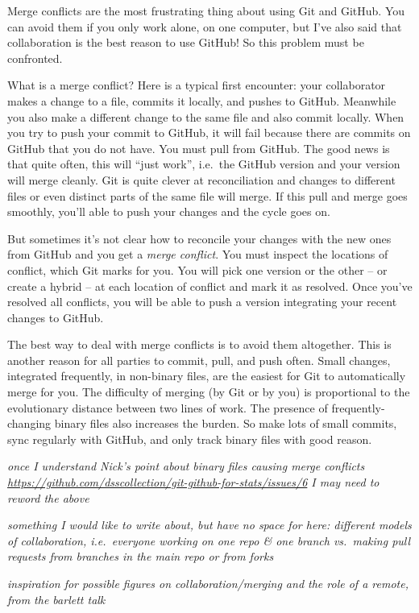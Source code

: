 \documentclass[12pt]{article}
\begin{document}
Merge conflicts are the most frustrating thing about using Git and
GitHub. You can avoid them if you only work alone, on one computer, but
I've also said that collaboration is the best reason to use GitHub! So
this problem must be confronted.

What is a merge conflict? Here is a typical first encounter: your
collaborator makes a change to a file, commits it locally, and pushes to
GitHub. Meanwhile you also make a different change to the same file and
also commit locally. When you try to push your commit to GitHub, it will
fail because there are commits on GitHub that you do not have. You must
pull from GitHub. The good news is that quite often, this will ``just
work'', i.e.~the GitHub version and your version will merge cleanly. Git
is quite clever at reconciliation and changes to different files or even
distinct parts of the same file will merge. If this pull and merge goes
smoothly, you'll able to push your changes and the cycle goes on.

But sometimes it's not clear how to reconcile your changes with the new
ones from GitHub and you get a \emph{merge conflict}. You must inspect
the locations of conflict, which Git marks for you. You will pick one
version or the other -- or create a hybrid -- at each location of
conflict and mark it as resolved. Once you've resolved all conflicts,
you will be able to push a version integrating your recent changes to
GitHub.

The best way to deal with merge conflicts is to avoid them altogether.
This is another reason for all parties to commit, pull, and push often.
Small changes, integrated frequently, in non-binary files, are the
easiest for Git to automatically merge for you. The difficulty of
merging (by Git or by you) is proportional to the evolutionary distance
between two lines of work. The presence of frequently-changing binary
files also increases the burden. So make lots of small commits, sync
regularly with GitHub, and only track binary files with good reason.

\emph{once I understand Nick's point about binary files causing merge
conflicts
\url{https://github.com/dsscollection/git-github-for-stats/issues/6} I
may need to reword the above}

\emph{something I would like to write about, but have no space for here:
different models of collaboration, i.e.~everyone working on one repo \&
one branch vs.~making pull requests from branches in the main repo or
from forks}

\emph{inspiration for possible figures on collaboration/merging and the
role of a remote, from the barlett talk}
\end{document}
